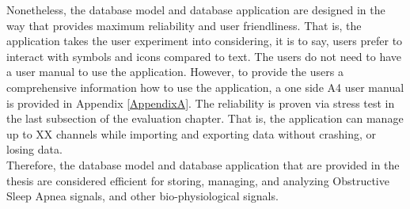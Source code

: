 Nonetheless, the database model and database application are designed in the way that provides maximum reliability and user friendliness. That is, the application takes the user experiment into considering, it is to say, users prefer to interact with symbols and icons compared to text. The users do not need to have a user manual to use the application. However, to provide the users a comprehensive information how to use the application, a one side A4 user manual is provided in Appendix \ref{AppendixA}. The reliability is proven via stress test in the last subsection of the evaluation chapter. That is, the application can manage up to XX channels while importing and exporting data without crashing, or losing data.\\
Therefore, the database model and database application that are provided in the thesis are considered efficient for storing, managing, and analyzing Obstructive Sleep Apnea signals, and other bio-physiological signals.
